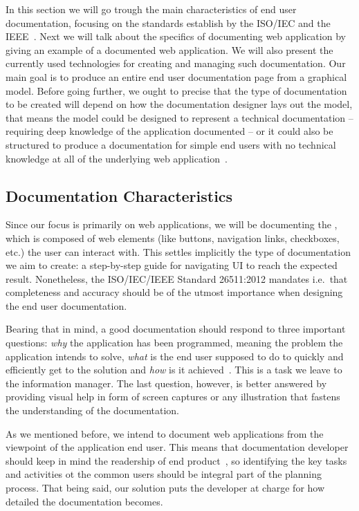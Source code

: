 In this section we will go trough the main characteristics of end user documentation, focusing on the standards establish by the ISO/IEC and the IEEE~\cite{ieee5712775, ISO-IEC-IEEE}. Next we will talk about the specifics of documenting web application by giving an example of a documented web application. We will also present the currently used technologies for creating and managing such documentation. Our main goal is to produce an entire end user documentation page from a graphical model. Before going further, we ought to precise that the type of documentation to be created will depend on how the documentation designer lays out the model, that means the model could be designed to represent a technical documentation -- requiring deep knowledge of the application documented -- or it could also be structured to produce a documentation for simple end users with no technical knowledge at all of the underlying web application~\cite{ieee6081814}.


\subsection{Documentation Characteristics}\label{sec:char}

Since our focus is primarily on web applications, we will be documenting the , which is composed of web elements (like buttons, navigation links, checkboxes, etc.) the user can interact with. This settles implicitly the type of documentation we aim to create: a step-by-step guide for navigating UI to reach the expected result. Nonetheless, the ISO/IEC/IEEE Standard 26511:2012 mandates i.e.~that completeness and accuracy should be of the utmost importance when designing the end user documentation.

Bearing that in mind, a good documentation should respond to three important questions: \textit{why} the application has been programmed, meaning the problem the application intends to solve, \textit{what} is the end user supposed to do to quickly and efficiently get to the solution and \textit{how} is it achieved~\cite{ISO-IEC-IEEE}. This is a task we leave to the information manager. The last question, however, is better answered by providing visual help in form of screen captures or any illustration that fastens the understanding of the documentation. 

As we mentioned before, we intend to document web applications from the viewpoint of the application end user. This means that documentation developer should keep in mind the readership of end product~\cite{ISO-IEC-IEEE}, so identifying the key tasks and activities ot the common users should be integral part of the planning process. That being said, our solution puts the developer at charge for how detailed the documentation becomes.

